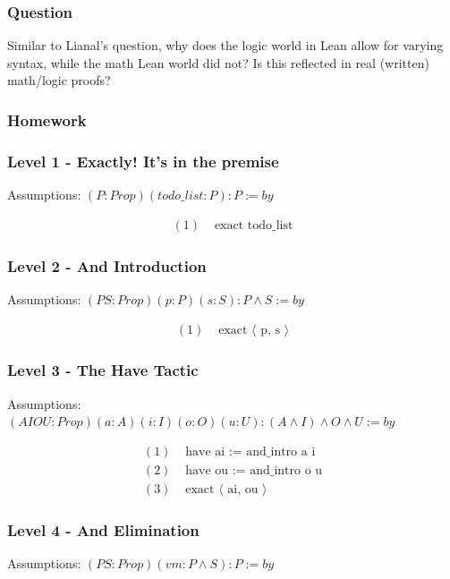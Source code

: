 \documentclass{article}
\theoremstyle{theorem}
\theoremstyle{definition}
\theoremstyle{remark}
\begin{document}
\subsubsection*{Question} Similar to Lianal's question, why does the logic world in Lean allow for varying syntax, while the math Lean world did not? Is this reflected in real (written) math/logic proofs?

\subsubsection*{Homework}

\subsubsection*{Level 1 - Exactly! It's in the premise}
Assumptions: $(P : Prop)(todo\_list : P) : P := by$

\[
\begin{aligned}
  (1)&\text{ exact todo\_list}
\end{aligned}
\]

\subsubsection*{Level 2 - And Introduction}
Assumptions: $(P S : Prop)(p: P)(s : S) : P \wedge S := by$

\[
\begin{aligned}
  (1)&\text{ exact ⟨ p, s ⟩}
\end{aligned}
\]

\subsubsection*{Level 3 - The Have Tactic}
Assumptions: $(A I O U : Prop)(a : A)(i : I)(o : O)(u : U) : (A \wedge I) \wedge O \wedge U := by$

\[
\begin{aligned}
  (1)& \text{ have ai } \text{:= and\_intro a i}\\
  (2)& \text{ have ou } \text{:= and\_intro o u}\\
  (3)& \text{ exact ⟨ ai, ou ⟩}
\end{aligned}
\]

\subsubsection*{Level 4 - And Elimination}
Assumptions: $(P S : Prop)(vm: P \wedge S) : P := by$
\end{document}
